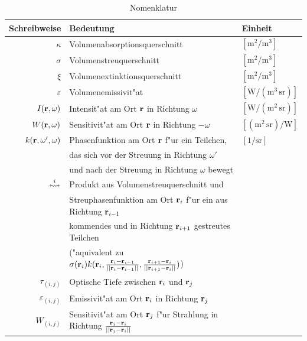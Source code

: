 \documentclass[11pt,a4paper,DIVcalc,BCOR8mm,titlepage,twoside]{scrartcl}
\begin{document}
	\begin{table}
		\caption{Nomenklatur}
		\begin{center}
		\begin{tabular}{rll}
			Schreibweise & Bedeutung & Einheit \\
			\hline
			$\kappa$ & Volumenabsorptionsquerschnitt & $\left[\text{m}^2/\text{m}^3\right]$ \\
			$\sigma$ & Volumenstreuquerschnitt & $\left[\text{m}^2/\text{m}^3\right]$ \\
			$\xi$ & Volumenextinktionsquerschnitt & $\left[\text{m}^2/\text{m}^3\right]$ \\
			$\varepsilon$ & Volumenemissivit"at & $\left[\text{W}/(\text{m}^3\,\text{sr})\right]$ \\
			$I(\mathbf{r},\omega)$ & Intensit"at am Ort $\mathbf{r}$ in Richtung $\omega$& $\left[\text{W}/(\text{m}^2\,\text{sr})\right]$ \\
			$W(\mathbf{r},\omega)$ & Sensitivit"at am Ort $\mathbf{r}$ in Richtung $-\omega$ & $\left[(\text{m}^2\,\text{sr})/\text{W}\right]$ \\
			$k(\mathbf{r},\omega',\omega)$ & Phasenfunktion am Ort $\mathbf{r}$ f"ur ein Teilchen, & $\left[1/\text{sr}\right]$ \\
				&das sich vor der Streuung in Richtung $\omega'$&\\
				&und nach der Streuung in Richtung $\omega$ bewegt& \\
			$\overset{i}{\leftrightsquigarrow}$ & Produkt aus Volumenstreuquerschnitt und&\\
			  & Streuphasenfunktion am Ort $\mathbf{r}_i$ f"ur ein aus Richtung $\mathbf{r}_{i-1}$&\\ 
				&kommendes und in Richtung $\mathbf{r}_{i+1}$ gestreutes Teilchen&\\
				&("aquivalent zu $\sigma(\mathbf{r}_i)k(\mathbf{r}_i,\frac{\mathbf{r}_i-\mathbf{r}_{i-1}}{||\mathbf{r}_i-\mathbf{r}_{i-1}||},\frac{\mathbf{r}_{i+1}-\mathbf{r}_i}{||\mathbf{r}_{i+1}-\mathbf{r}_i||})$)& \\
			$\tau_{(i,j)}$ & Optische Tiefe zwischen $\mathbf{r}_i$ und $\mathbf{r}_j$ & \\
			$\varepsilon_{(i,j)}$ & Emissivit"at am Ort $\mathbf{r}_i$ in Richtung $\mathbf{r}_j$ & \\
			$W_{(i,j)}$ & Sensitivit"at am Ort $\mathbf{r}_j$ f"ur Strahlung in Richtung $\frac{\mathbf{r}_j-\mathbf{r}_i}{||\mathbf{r}_j-\mathbf{r}_i||}$ &
		\end{tabular}
		\end{center}
		\label{tab:nomenklatur}
	\end{table}
	
\end{document}
